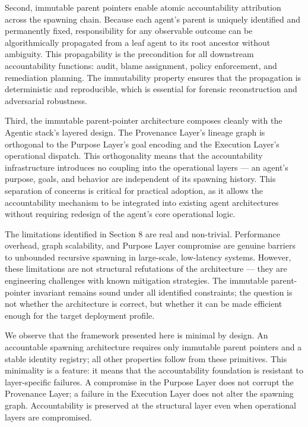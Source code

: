 Second, immutable parent pointers enable atomic accountability
attribution across the spawning chain. Because each agent's parent is
uniquely identified and permanently fixed, responsibility for any
observable outcome can be algorithmically propagated from a leaf agent
to its root ancestor without ambiguity. This propagability is the
precondition for all downstream accountability functions: audit,
blame assignment, policy enforcement, and remediation planning. The
immutability property ensures that the propagation is deterministic
and reproducible, which is essential for forensic reconstruction and
adversarial robustness.

Third, the immutable parent-pointer architecture composes cleanly with
the Agentic stack's layered design. The Provenance Layer's lineage
graph is orthogonal to the Purpose Layer's goal encoding and the
Execution Layer's operational dispatch. This orthogonality means that
the accountability infrastructure introduces no coupling into the
operational layers — an agent's purpose, goals, and behavior are
independent of its spawning history. This separation of concerns is
critical for practical adoption, as it allows the accountability
mechanism to be integrated into existing agent architectures without
requiring redesign of the agent's core operational logic.

The limitations identified in Section 8 are real and non-trivial.
Performance overhead, graph scalability, and Purpose Layer compromise
are genuine barriers to unbounded recursive spawning in large-scale,
low-latency systems. However, these limitations are not structural
refutations of the architecture — they are engineering challenges with
known mitigation strategies. The immutable parent-pointer invariant
remains sound under all identified constraints; the question is not
whether the architecture is correct, but whether it can be made
efficient enough for the target deployment profile.

We observe that the framework presented here is minimal by design.
An accountable spawning architecture requires only immutable parent
pointers and a stable identity registry; all other properties follow
from these primitives. This minimality is a feature: it means that the
accountability foundation is resistant to layer-specific failures.
A compromise in the Purpose Layer does not corrupt the Provenance Layer;
a failure in the Execution Layer does not alter the spawning graph.
Accountability is preserved at the structural layer even when
operational layers are compromised.

